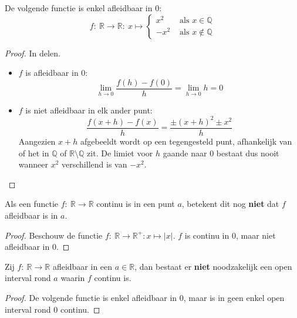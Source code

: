 \documentclass[main.tex]{subfiles}
\begin{document}
\begin{vb}
  \label{vb:erge-functie-afleidbaar-in-0}
  De volgende functie is enkel afleidbaar in $0$:
  \[
  f:\ \mathbb{R}\rightarrow \mathbb{R}:\ x \mapsto
  \left\{
    \begin{array}{rl}
      x^{2} & \text{ als } x\in \mathbb{Q}\\
      -x^{2} & \text{ als } x \not \in \mathbb{Q}
    \end{array}
  \right.
  \]

  \begin{proof}
    In delen.
    \begin{itemize}
    \item $f$ is afleidbaar in $0$:\\
      \[ \lim_{h \rightarrow 0}\frac{f(h) - f(0)}{h} = \lim_{h \rightarrow 0}h = 0 \]
    \item $f$ is niet afleidbaar in elk ander punt:\\
        \[
        \frac{f(x+h)-f(x)}{h}
        = \frac{\pm(x+h)^{2}\pm x^{2}}{h}
        \]
        Aangezien $x+h$ afgebeeldt wordt op een tegengesteld punt, afhankelijk van of het in $\mathbb{Q}$ of $\mathbb{R} \setminus \mathbb{Q}$ zit. 
        De limiet voor $h$ gaande naar $0$ bestaat dus nooit wanneer $x^{2}$ verschillend is van $-x^{2}$.
    \end{itemize}
  \end{proof}
\end{vb}

\begin{tvb}
  Als een functie $f:\ \mathbb{R} \rightarrow \mathbb{R}$ continu is in een punt $a$, betekent dit nog \textbf{niet} dat $f$ afleidbaar is in $a$.

  \begin{proof}
    Beschouw de functie $f:\ \mathbb{R} \rightarrow \mathbb{R}^{+}: x \mapsto |x|$.
    $f$ is continu in $0$, maar niet afleidbaar in $0$.
  \end{proof}
\end{tvb}


\begin{tvb}
  Zij $f:\ \mathbb{R} \rightarrow \mathbb{R}$ afleidbaar in een $a\in \mathbb{R}$, dan bestaat er \textbf{niet} noodzakelijk een open interval rond $a$ waarin $f$ continu is.

  \begin{proof}
    De volgende functie is enkel afleidbaar in $0$, maar is in geen enkel open interval rond $0$ continu.\waarom
  \end{proof}
\feed
\end{tvb}
\end{document}
